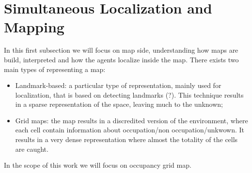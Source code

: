 \section{Simultaneous Localization and Mapping}
In this first subsection we will focus on map side, understanding how maps are build, interpreted and how the agents localize inside the map. There exists two main types of representing a map:
\begin{itemize}
    \item Landmark-based: a particular type of representation, mainly used for localization, that is based on detecting landmarks (?). This technique results in a sparse representation of the space, leaving much to the unknown;
    \item Grid maps: the map results in a discredited version of the environment, where each cell contain information about occupation/non occupation/unkwown. It results in a very dense representation where almost the totality of the cells are caught.
\end{itemize}

In the scope of this work we will focus on occupancy grid map.
